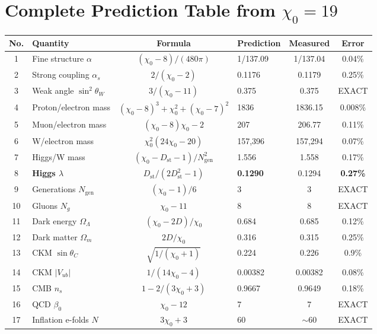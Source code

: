 \documentclass[12pt,a4paper]{article}
\newcommand{\chizero}{\chi_0}
\newcommand{\Dst}{D_{\mathrm{st}}}
\newcommand{\Ngen}{N_{\mathrm{gen}}}
\begin{document}
\section{Complete Prediction Table from \texorpdfstring{$\chizero = 19$}{chi0 = 19}}

\begin{table}[h]
\centering\small
\begin{tabular}{clclcc}
\toprule
No. & Quantity & Formula & Prediction & Measured & Error \\
\midrule
1 & Fine structure $\alpha$ & $(\chizero\!-\!8)/(480\pi)$ & 1/137.09 & 1/137.04 & 0.04\% \\
2 & Strong coupling $\alpha_s$ & $2/(\chizero\!-\!2)$ & 0.1176 & 0.1179 & 0.25\% \\
3 & Weak angle $\sin^2\theta_W$ & $3/(\chizero\!-\!11)$ & 0.375 & 0.375 & EXACT \\
4 & Proton/electron mass & $(\chizero\!-\!8)^3\!+\!\chizero^2\!+\!(\chizero\!-\!7)^2$ & 1836 & 1836.15 & 0.008\% \\
5 & Muon/electron mass & $(\chizero\!-\!8)\chizero\!-\!2$ & 207 & 206.77 & 0.11\% \\
6 & W/electron mass & $\chizero^2(24\chizero\!-\!20)$ & 157,396 & 157,294 & 0.07\% \\
7 & Higgs/W mass & $(\chizero\!-\!\Dst\!-\!1)/\Ngen^2$ & 1.556 & 1.558 & 0.17\% \\
8 & \textbf{Higgs $\lambda$} & $\Dst/(2\Dst^2\!-\!1)$ & \textbf{0.1290} & 0.1294 & \textbf{0.27\%} \\
9 & Generations $\Ngen$ & $(\chizero\!-\!1)/6$ & 3 & 3 & EXACT \\
10 & Gluons $N_g$ & $\chizero\!-\!11$ & 8 & 8 & EXACT \\
11 & Dark energy $\Omega_\Lambda$ & $(\chizero\!-\!2D)/\chizero$ & 0.684 & 0.685 & 0.12\% \\
12 & Dark matter $\Omega_m$ & $2D/\chizero$ & 0.316 & 0.315 & 0.25\% \\
13 & CKM $\sin\theta_C$ & $\sqrt{1/(\chizero\!+\!1)}$ & 0.224 & 0.226 & 0.9\% \\
14 & CKM $|V_{ub}|$ & $1/(14\chizero\!-\!4)$ & 0.00382 & 0.00382 & 0.08\% \\
15 & CMB $n_s$ & $1\!-\!2/(3\chizero\!+\!3)$ & 0.9667 & 0.9649 & 0.18\% \\
16 & QCD $\beta_0$ & $\chizero\!-\!12$ & 7 & 7 & EXACT \\
17 & Inflation e-folds $N$ & $3\chizero\!+\!3$ & 60 & $\sim$60 & EXACT \\

\end{tabular}
\end{table}
\end{document}
